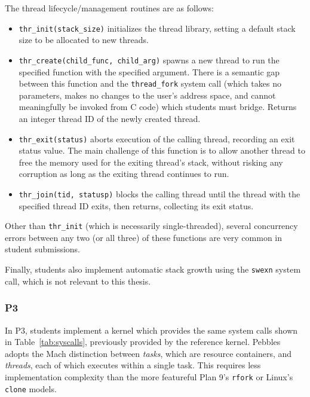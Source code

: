 The thread lifecycle/management routines are as follows:
\begin{itemize}
	\item {\tt thr\_init(stack\_size)} initializes the thread library, setting a default stack size to be allocated to new threads.
	\item {\tt thr\_create(child\_func, child\_arg)} spawns a new thread to run the specified function with the specified argument. There is a semantic gap between this function and the {\tt thread\_fork} system call (which takes no parameters, makes no changes to the user's address space, and cannot meaningfully be invoked from C code) which students must bridge.
		Returns an integer thread ID of the newly created thread.
	\item {\tt thr\_exit(status)} aborts execution of the calling thread, recording an exit status value.
		The main challenge of this function is to allow another thread to free the memory used for the exiting thread's stack,
		without risking any corruption as long as the exiting thread continues to run.
	\item {\tt thr\_join(tid, statusp)} blocks the calling thread until the thread with the specified thread ID exits, then returns, collecting its exit status.
\end{itemize}
Other than {\tt thr\_init} (which is necessarily single-threaded), several concurrency errors between any two (or all three) of these functions are very common in student submissions.

Finally, students also implement automatic stack growth using the {\tt swexn} system call, which is not relevant to this thesis.

\subsubsection{P3}
In P3, students implement a kernel which provides the same system calls shown in Table~\ref{tab:syscalls}, previously provided by the reference kernel.
Pebbles adopts the Mach \cite{DBLP:conf/usenix/AccettaBBGRTY86} distinction between {\em tasks}, which are resource containers, and {\em threads}, each of which executes within a single task.
This requires less implementation complexity than the more featureful Plan 9's {\tt rfork} \cite{Pike90plan9} or Linux's {\tt clone} models.

